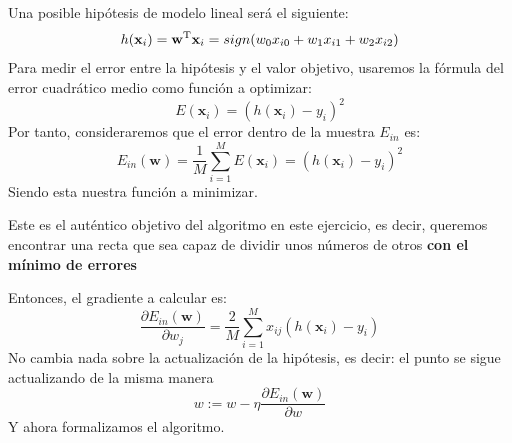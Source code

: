 \documentclass{article}
\begin{document}
    Una posible hipótesis de modelo lineal será el siguiente:
    \begin{equation*}
        h(\textbf{x}_i) = \textbf{w}^\textmd{T}\textbf{x}_i = sign(w_0x_{i0} + w_1x_{i1} + w_2x_{i2})
    \end{equation*}
    Para medir el error entre la hipótesis y el valor objetivo, usaremos la fórmula del error cuadrático medio
    como función a optimizar:
    \begin{equation*}
        E(\textbf{x}_i) = (h(\textbf{x}_i) - y_i)^2
    \end{equation*}
    Por tanto, consideraremos que el error dentro de la muestra $E_{in}$ es:
    \begin{equation*}
        E_{in}(\textbf{w}) = \frac{1}{M}\sum_{i=1}^{M}E(\textbf{x}_i) = (h(\textbf{x}_i) - y_i)^2
    \end{equation*}
    Siendo esta nuestra función a minimizar.

    Este es el auténtico objetivo del algoritmo en este ejercicio, es decir, queremos encontrar una recta que sea capaz
    de dividir unos números de otros \textbf{con el mínimo de errores}

    \pagebreak
    
    Entonces, el gradiente a calcular es:
    \begin{equation*}
        \frac{\partial E_{in}(\textbf{w})}{\partial w_j} =
        \frac{2}{M} \sum_{i=1}^{M}x_{ij}\left( h(\textbf{x}_i) - y_i \right)
    \end{equation*}
    No cambia nada sobre la actualización de la hipótesis, es decir: el punto se sigue actualizando de la
    misma manera
    \begin{equation*}
        w := w - \eta\frac{\partial E_{in}(\textbf{w})}{\partial w}
    \end{equation*}
    Y ahora formalizamos el algoritmo.
\end{document}
